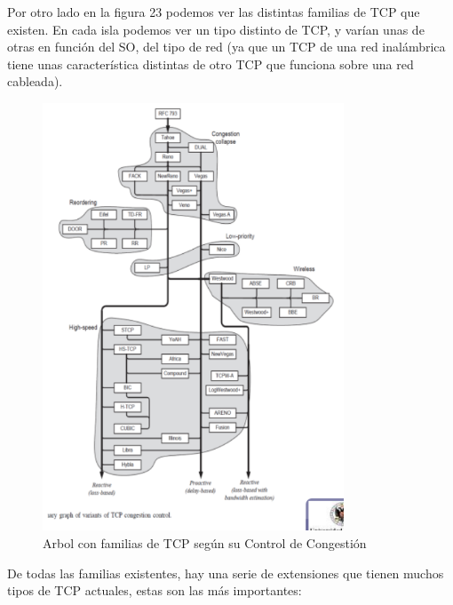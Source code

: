 \documentclass[a4paper,11pt]{article}
\begin{document}
Por otro lado en la figura 23 podemos ver las distintas familias de TCP que existen. En cada isla podemos ver un tipo distinto de TCP, y varían unas de otras en función del SO, del tipo de red (ya que un TCP de una red inalámbrica tiene unas característica distintas de otro TCP que funciona sobre una red cableada). \\

\begin{figure}[h]
\centering
\caption{Arbol con familias de TCP según su Control de Congestión}
\includegraphics[scale=1,width=0.8\textwidth]{familias_tcp.png}
\end{figure}

De todas las familias existentes, hay una serie de extensiones que tienen muchos tipos de TCP actuales, estas son las más importantes:
\end{document}
